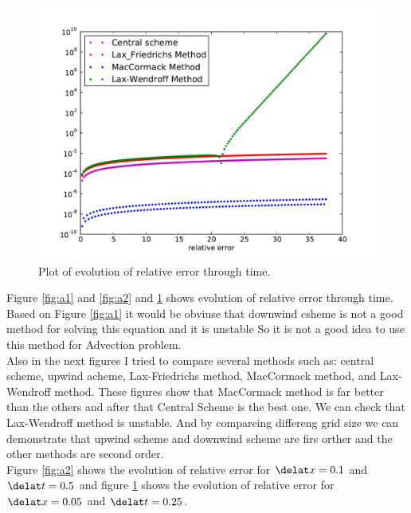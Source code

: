 \documentclass[10pt]{article}
\begin{document}
\begin{figure}[hbt]
 \begin{center}
  \includegraphics[scale=0.3]{Plots/plot5-2.pdf}
  \caption{\label{fig:a3} Plot of evolution of relative error through time.}
 \end{center}
\end{figure}

Figure \ref{fig:a1} and \ref{fig:a2} and \ref{fig:a3} shows evolution of relative error through time. Based on Figure \ref{fig:a1} it would be obviuse that downwind csheme is not a good method for solving this equation and it is unstable So it is not a good idea to use this method for Advection problem.\\

Also in the next figures I tried to compare several methods such as: central scheme, upwind acheme, Lax-Friedrichs method, MacCormack method, and Lax-Wendroff method. These figures show that MacCormack method is far better than the others and after that Central Scheme is the best one. We can check that Lax-Wendroff method is unstable. And by compareing differeng grid size we can demonstrate that upwind scheme and downwind scheme are firs orther and the other methods are second order.\\

Figure \ref{fig:a2} shows the evolution of relative error for $\delat x = 0.1$ and $\delat t = 0.5$ and figure \ref{fig:a3} shows the evolution of relative error for $\delat x = 0.05$ and $\delat t = 0.25$.\\

\pagebreak
\end{document}
